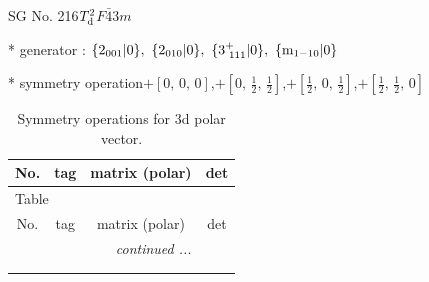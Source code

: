 \documentclass[fleqn,8pt]{jsarticle}
\begin{document}
\setcounter{MaxMatrixCols}{32}

\renewcommand{\tablename}{Table~}
\renewcommand{\figurename}{Figure~}
\begin{center}
\LARGE
SG No. 216\quad$T_{\rm d}^{2}$\quad$F\bar{4}3m$\quad[ cubic ]
\end{center}

* generator : $\{2{}_{001}|0\},\,\,\{2{}_{010}|0\},\,\,\{3^{+}_{\,\,111}|0\},\,\,\{{\rm m}_{1-10}|0\}$

* symmetry operation\quad$+\left[ 0,\, 0,\, 0 \right]$,\quad $+\left[ 0,\, \frac{1}{2},\, \frac{1}{2} \right]$,\quad $+\left[ \frac{1}{2},\, 0,\, \frac{1}{2} \right]$,\quad $+\left[ \frac{1}{2},\, \frac{1}{2},\, 0 \right]$
\renewcommand{\arraystretch}{1.3}
\begin{longtable}{cccc}
\caption{Symmetry operations for 3d polar vector.}
 \\
 \hline \hline
No. & tag & matrix (polar) & det \\ \hline \endfirsthead

\multicolumn{3}{l}{\tablename\ \thetable{}} \\
 \hline \hline
No. & tag & matrix (polar) & det \\ \hline \endhead

 \hline \hline
\multicolumn{3}{r}{\footnotesize\it continued ...} \\ \endfoot

 \hline \hline
\multicolumn{3}{r}{} \\ \endlastfoot


\end{longtable}
\end{document}
